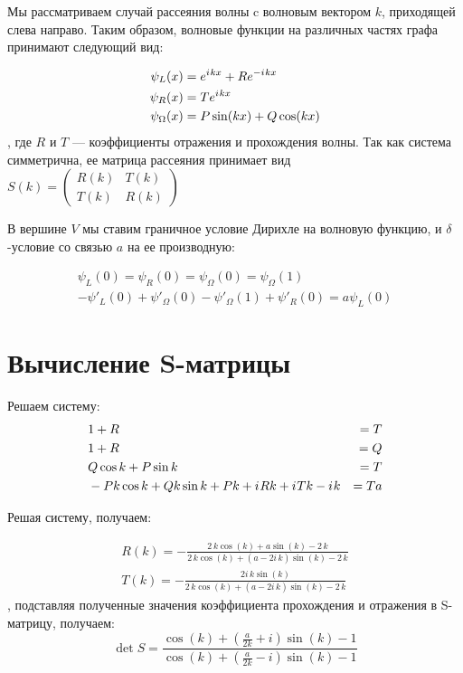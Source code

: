 \documentclass{nsart_eng}
\newcommand{\eexp}[1]{e^{#1}}
\newcommand{\iu}{{i\mkern1mu}}
\begin{document}
Мы рассматриваем случай рассеяния волны c волновым вектором $k$, приходящей слева направо. Таким образом, волновые функции на различных частях графа принимают следующий вид:

\begin{align*}
\psi_L(x) &= \eexp{\iu k x} + R \eexp{-\iu k x} \\
\psi_R(x) &= T \eexp{\iu k x}\\
\psi_\Omega(x) &= P \sin(k x) + Q \cos(k x)
\end{align*}
, где $R$ и $T$ — коэффициенты отражения и прохождения волны. Так как система симметрична, ее матрица рассеяния принимает вид
$S(k) = \begin{pmatrix} R(k) & T(k) \\ T(k) & R(k) \end{pmatrix}$

В вершине $V$ мы ставим граничное условие Дирихле на волновую функцию, и $\delta$-условие со связью $a$ на ее производную:

\begin{align*}
\psi_L(0) = \psi_R(0) = \psi_\Omega(0) = \psi_\Omega(1) \\ 
-\psi'_L(0) + \psi'_\Omega(0) - \psi'_\Omega(1) + \psi'_R(0) = a \psi_L(0)
\end{align*}


\section{Вычисление S-матрицы}

Решаем систему:
\begin{align*}
& 1 + R &= T \\
& 1 + R &= Q \\
& Q \cos k + P \sin k &= T \\
& -P k \cos k + Q k \sin k + P k + \iu R k + \iu T k - \iu k &= T a
\end{align*}

Решая систему, получаем:

\begin{align*}
R(k) = -\frac{2 \, k \cos\left(k\right) + a \sin\left(k\right) - 2 \, k}{2 \, k \cos\left(k\right) + {\left(a - 2 i \, k\right)} \sin\left(k\right) - 2 \, k} \\
T(k) = -\frac{2 i \, k \sin\left(k\right)}{2 \, k \cos\left(k\right) + {\left(a - 2 i \, k\right)} \sin\left(k\right) - 2 \, k}
\end{align*}
, подставляя полученные значения коэффициента прохождения и отражения в S-матрицу, получаем:
\[
\det S = 
\frac
{\cos\left(k\right) + {\left(\frac{a}{2 k} + i\right)} \sin\left(k\right) - 1}
{\cos\left(k\right) + {\left(\frac{a}{2 k} - i\right)} \sin\left(k\right) - 1}
\]
\end{document}
